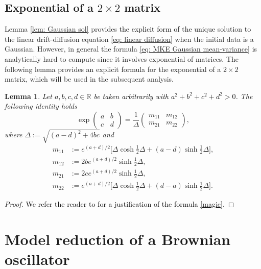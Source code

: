\documentclass[a4paper,twoside]{article}      %
\newtheorem{lemma}[theorem]{Lemma}
\theoremstyle{definition}
\newcommand{\AM}{\textcolor{black}}
\begin{document}
\subsection{Exponential of a $2\times 2$ matrix}
Lemma \ref{lem: Gaussian sol} provides \AM{the explicit form of the unique} solution to the linear drift-diffusion equation \eqref{eq: linear diffusion} when the initial data is a Gaussian. However, in general the formula \eqref{eq: MKE Gaussian mean-variance} is analytically hard to compute since it involves exponential of matrices. The following lemma provides an explicit formula for the exponential of a $2\times 2$ matrix, which will be used in the subsequent analysis.
\begin{lemma}
\label{lem: exponential matrix}
\AM{Let $a,b,c,d \in\mathbb{R}$ be taken arbitrarily with $a^2+b^2+c^2+d^2>0$.} The following identity holds
\begin{equation}\label{magic}
    \exp\begin{pmatrix}
        a&b\\c &d
    \end{pmatrix}=\frac{1}{\Delta}\begin{pmatrix}
        m_{11}&m_{12}\\
        m_{21}& m_{22}
    \end{pmatrix},
\end{equation}
where $\Delta:=\sqrt{(a-d)^2+4bc}$ and
\begin{align*}
    m_{11}&:=e^{(a+d)/2}\Big[\Delta \cosh{\frac{1}{2}\Delta} +(a-d)\sinh{\frac{1}{2}\Delta}\Big],\\
    m_{12}&:=2be^{(a+d)/2}\sinh{\frac{1}{2}\Delta},
    \\ m_{21}&:=2 c e^{(a+d)/2}\sinh{\frac{1}{2}\Delta},
    \\ m_{22}&:=e^{(a+d)/2}\Big[\Delta \cosh{\frac{1}{2}\Delta} +(d-a)\sinh{\frac{1}{2}\Delta}\Big].
\end{align*}
\end{lemma}

\begin{proof}\AM{We refer the reader to \cite{bernstein1993} for a justification of the formula \eqref{magic}.}
\end{proof}



\section{Model reduction of a Brownian oscillator}
\label{sec:sec3}
\end{document}
